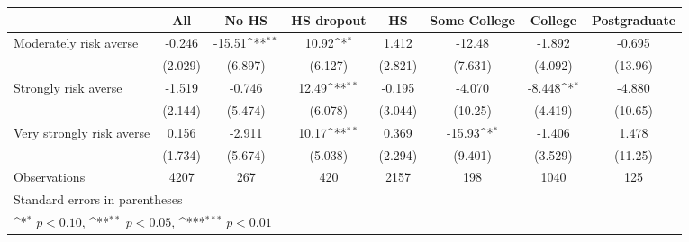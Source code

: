 {
\def\sym#1{\ifmmode^{#1}\else\(^{#1}\)\fi}
\begin{tabular}{l*{7}{c}}
\toprule
                    &\multicolumn{1}{c}{All}&\multicolumn{1}{c}{No HS}&\multicolumn{1}{c}{HS dropout}&\multicolumn{1}{c}{HS}&\multicolumn{1}{c}{Some College}&\multicolumn{1}{c}{College}&\multicolumn{1}{c}{Postgraduate}\\
\midrule
Moderately risk averse&      -0.246         &      -15.51\sym{**} &       10.92\sym{*}  &       1.412         &      -12.48         &      -1.892         &      -0.695         \\
                    &     (2.029)         &     (6.897)         &     (6.127)         &     (2.821)         &     (7.631)         &     (4.092)         &     (13.96)         \\
\addlinespace
Strongly risk averse&      -1.519         &      -0.746         &       12.49\sym{**} &      -0.195         &      -4.070         &      -8.448\sym{*}  &      -4.880         \\
                    &     (2.144)         &     (5.474)         &     (6.078)         &     (3.044)         &     (10.25)         &     (4.419)         &     (10.65)         \\
\addlinespace
Very strongly risk averse&       0.156         &      -2.911         &       10.17\sym{**} &       0.369         &      -15.93\sym{*}  &      -1.406         &       1.478         \\
                    &     (1.734)         &     (5.674)         &     (5.038)         &     (2.294)         &     (9.401)         &     (3.529)         &     (11.25)         \\
\midrule
Observations        &        4207         &         267         &         420         &        2157         &         198         &        1040         &         125         \\
\bottomrule
\multicolumn{8}{l}{\footnotesize Standard errors in parentheses}\\
\multicolumn{8}{l}{\footnotesize \sym{*} \(p<0.10\), \sym{**} \(p<0.05\), \sym{***} \(p<0.01\)}\\
\end{tabular}
}
